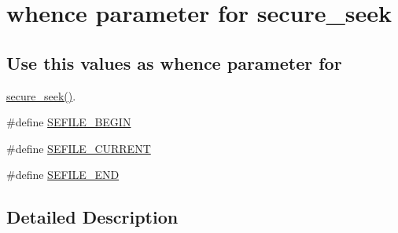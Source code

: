 \hypertarget{group__whence}{\section{whence parameter for secure\-\_\-seek}
\label{group__whence}
}
\subsection*{Use this values as whence parameter for}
\label{_amgrp2f36fb5bbc515d158e6cb06792c45317}%
\hyperlink{_s_efile_8c_a157807247b4913a73fc3b6677a61e6a3}{secure\-\_\-seek()}. \begin{DoxyCompactItemize}
\item 
\#define \hyperlink{group__whence_gab6c0208f58dfecf3ee595f75a3156a27}{S\-E\-F\-I\-L\-E\-\_\-\-B\-E\-G\-I\-N}
\item 
\#define \hyperlink{group__whence_ga96800ac1f03fb12ac3f761d37553ddc3}{S\-E\-F\-I\-L\-E\-\_\-\-C\-U\-R\-R\-E\-N\-T}
\item 
\#define \hyperlink{group__whence_gac99113dc9b1f7710c8f451ce0b76c925}{S\-E\-F\-I\-L\-E\-\_\-\-E\-N\-D}
\end{DoxyCompactItemize}


\subsection{Detailed Description}


